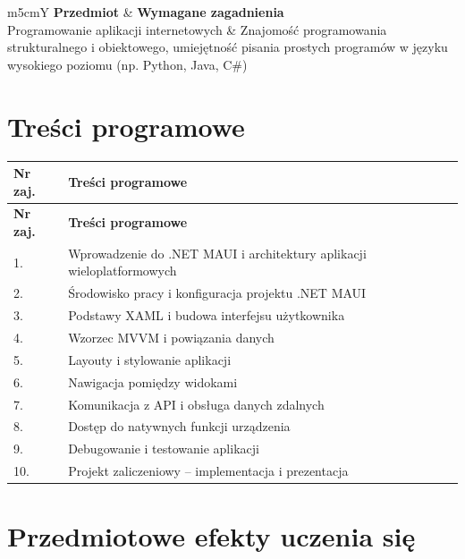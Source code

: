 \documentclass[12pt, a4paper]{article}
\newcommand{\thdrule}{\noalign{\global\setlength{\extrarowheight}{0pt}}}
\newcommand{\thdend}{\noalign{\global\setlength{\extrarowheight}{3pt}}}
\begin{document}
{\scriptsize
\begin{tabularx}{\textwidth}{m{5cm}Y}
\thdrule\toprule
{} {\color{white}\textbf{Przedmiot}} & {\color{white}\textbf{Wymagane zagadnienia}} \\
\midrule\thdend
   Programowanie aplikacji internetowych & Znajomość programowania strukturalnego i obiektowego, umiejętność pisania prostych programów w języku wysokiego poziomu (np. Python, Java, C\#) \\
\bottomrule
\end{tabularx}}

\section{Treści programowe}

{\scriptsize
\begin{longtable}{m{1.5cm}m{14.5cm}}
\thdrule\toprule
\rowcolor{pjatkRed} {\color{white}\textbf{Nr zaj.}} & {\color{white}\textbf{Treści programowe}} \\
\midrule\thdend
\endfirsthead
\thdrule\toprule
\rowcolor{pjatkRed} {\color{white}\textbf{Nr zaj.}} & {\color{white}\textbf{Treści programowe}} \\
\midrule\thdend
\endhead
  \rowcolor{tableRowLight} 1. & Wprowadzenie do .NET MAUI i architektury aplikacji wieloplatformowych \\
  \rowcolor{tableRowAlt} 2. & Środowisko pracy i konfiguracja projektu .NET MAUI \\
  \rowcolor{tableRowLight} 3. & Podstawy XAML i budowa interfejsu użytkownika \\
  \rowcolor{tableRowAlt} 4. & Wzorzec MVVM i powiązania danych \\
  \rowcolor{tableRowLight} 5. & Layouty i stylowanie aplikacji \\
  \rowcolor{tableRowAlt} 6. & Nawigacja pomiędzy widokami \\
  \rowcolor{tableRowLight} 7. & Komunikacja z API i obsługa danych zdalnych \\
  \rowcolor{tableRowAlt} 8. & Dostęp do natywnych funkcji urządzenia \\
  \rowcolor{tableRowLight} 9. & Debugowanie i testowanie aplikacji \\
  \rowcolor{tableRowAlt} 10. & Projekt zaliczeniowy – implementacja i prezentacja \\
\bottomrule
\end{longtable}}

\section{Przedmiotowe efekty uczenia się}
\end{document}
